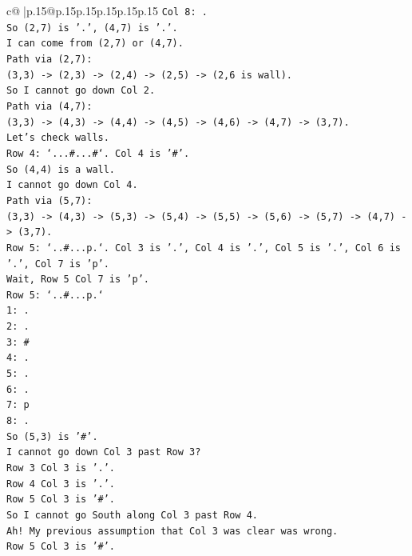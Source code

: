 \documentclass{article}
\begin{document}
{\begin{supertabular}{c@{$\;$}|p{.15\linewidth}@{}p{.15\linewidth}p{.15\linewidth}p{.15\linewidth}p{.15\linewidth}p{.15\linewidth}}
{{{\texttt{Col 8: .} \\
\texttt{So (2,7) is '.', (4,7) is '.'.} \\
\texttt{I can come from (2,7) or (4,7).} \\
\texttt{Path via (2,7):} \\
\texttt{(3,3) {-}> (2,3) {-}> (2,4) {-}> (2,5) {-}> (2,6 is wall).} \\
\texttt{So I cannot go down Col 2.} \\
\texttt{Path via (4,7):} \\
\texttt{(3,3) {-}> (4,3) {-}> (4,4) {-}> (4,5) {-}> (4,6) {-}> (4,7) {-}> (3,7).} \\
\texttt{Let's check walls.} \\
\texttt{Row 4: `...\#...\#`. Col 4 is '\#'.} \\
\texttt{So (4,4) is a wall.} \\
\texttt{I cannot go down Col 4.} \\
\texttt{Path via (5,7):} \\
\texttt{(3,3) {-}> (4,3) {-}> (5,3) {-}> (5,4) {-}> (5,5) {-}> (5,6) {-}> (5,7) {-}> (4,7) {-}> (3,7).} \\
\texttt{Row 5: `..\#...p.`. Col 3 is '.', Col 4 is '.', Col 5 is '.', Col 6 is '.', Col 7 is 'p'.} \\
\texttt{Wait, Row 5 Col 7 is 'p'.} \\
\texttt{Row 5: `..\#...p.`} \\
\texttt{1: .} \\
\texttt{2: .} \\
\texttt{3: \#} \\
\texttt{4: .} \\
\texttt{5: .} \\
\texttt{6: .} \\
\texttt{7: p} \\
\texttt{8: .} \\
\texttt{So (5,3) is '\#'.} \\
\texttt{I cannot go down Col 3 past Row 3?} \\
\texttt{Row 3 Col 3 is '.'.} \\
\texttt{Row 4 Col 3 is '.'.} \\
\texttt{Row 5 Col 3 is '\#'.} \\
\texttt{So I cannot go South along Col 3 past Row 4.} \\
\texttt{Ah! My previous assumption that Col 3 was clear was wrong.} \\
\texttt{Row 5 Col 3 is '\#'.} \\
}}}
\end{supertabular}}
\end{document}
